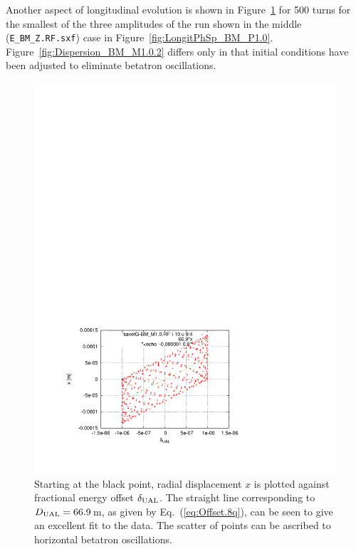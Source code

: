\documentclass[]{article}
\begin{document}
Another aspect of longitudinal evolution is shown in 
Figure~\ref{fig:Dispersion_BM_M1.0} for 500
turns for the smallest of the three amplitudes
of the run shown in the middle ({\tt E\_BM\_Z.RF.sxf}) case in 
Figure~\ref{fig:LongitPhSp_BM_P1.0}. 
Figure~\ref{fig:Dispersion_BM_M1.0.2} differs only in that initial
conditions have been adjusted to eliminate betatron oscillations.
%
\begin{figure}[h]
\begin{minipage}[b]{\linewidth}
\centering
\includegraphics[scale=0.7]{pdf/Dispersion_BM_M1p0.pdf}
\caption{\label{fig:Dispersion_BM_M1.0}Starting at the black point, 
radial displacement $x$ is plotted against fractional energy offset 
$\delta_{\rm UAL}$. The straight line corresponding to 
$D_{\rm UAL}=66.9$\,m, as given by Eq.~(\ref{eq:Offset.8q}),
can be seen to give an excellent fit to the data. The scatter of points
can be ascribed to horizontal betatron oscillations.
}
\end{minipage}
\begin{minipage}[b]{\linewidth}

\end{minipage}
\end{figure}
\end{document}
